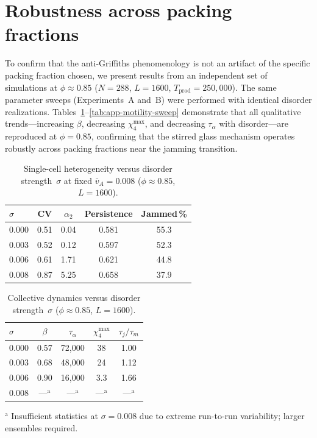 \documentclass[aps,pre,twocolumn,superscriptaddress,longbibliography,floatfix]{revtex4-2}
\begin{document}
\appendix
\section{Robustness across packing fractions}
\label{app:phi85}

To confirm that the anti-Griffiths phenomenology is not an artifact of
the specific packing fraction chosen, we present results from an
independent set of simulations at $\phi\!\approx\!0.85$
($N\!=\!288$, $L\!=\!1600$, $T_{\mathrm{prod}}\!=\!250{,}000$).  The
same parameter sweeps (Experiments~A and~B) were performed with
identical disorder realizations.  Tables~\ref{tab:app-single-cell}--\ref{tab:app-motility-sweep} demonstrate that
all qualitative trends---increasing $\beta$, decreasing $\chi_4^{\max}$,
and decreasing $\tau_\alpha$ with disorder---are reproduced at
$\phi\!=\!0.85$, confirming that the stirred glass mechanism operates
robustly across packing fractions near the jamming transition.

\begin{table}[h]
\caption{Single-cell heterogeneity versus disorder strength~$\sigma$ at
  fixed $\bar{v}_A\!=\!0.008$ ($\phi\!\approx\!0.85$, $L\!=\!1600$).}
\label{tab:app-single-cell}
\begin{ruledtabular}
\begin{tabular}{lcccc}
$\sigma$ & CV & $\alpha_2$ & Persistence & Jammed\,\% \\
\midrule
0.000 & 0.51 & 0.04 & 0.581 & 55.3 \\
0.003 & 0.52 & 0.12 & 0.597 & 52.3 \\
0.006 & 0.61 & 1.71 & 0.621 & 44.8 \\
0.008 & 0.87 & 5.25 & 0.658 & 37.9 \\
\end{tabular}
\end{ruledtabular}
\end{table}

\begin{table}[h]
\caption{Collective dynamics versus disorder strength~$\sigma$
  ($\phi\!\approx\!0.85$, $L\!=\!1600$).}
\label{tab:app-collective}
\begin{ruledtabular}
\begin{tabular}{lcccc}
$\sigma$ & $\beta$ & $\tau_\alpha$ & $\chi_4^{\max}$
  & $\tau_j/\tau_m$ \\
\midrule
0.000 & 0.57 & 72{,}000 & 38 & 1.00 \\
0.003 & 0.68 & 48{,}000 & 24 & 1.12 \\
0.006 & 0.90 & 16{,}000 & 3.3 & 1.66 \\
0.008 & ---$^{\text{a}}$ & ---$^{\text{a}}$ & ---$^{\text{a}}$ & ---$^{\text{a}}$ \\
\end{tabular}
\end{ruledtabular}
$^{\text{a}}$ Insufficient statistics at $\sigma\!=\!0.008$ due to
extreme run-to-run variability; larger ensembles required.
\end{table}
\end{document}
